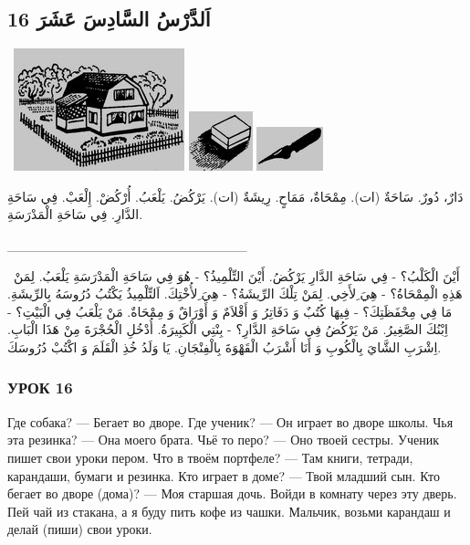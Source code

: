 \documentclass[a5paper]{article}
\begin{document}
\subsection[16 اَلدَّرْسُ السَّادِسَ عَشَرَ]{16 اَلدَّرْسُ السَّادِسَ عَشَرَ}
\  \includegraphics[width=1.948in,height=1.3957in]{images/MuhammadBagauddinprettified-img029.jpg}   \includegraphics[width=0.7291in,height=0.6772in]{images/MuhammadBagauddinprettified-img030.jpg}   \includegraphics[width=0.7602in,height=0.5in]{images/MuhammadBagauddinprettified-img031.jpg} 

دَارٌ، دُورٌ. سَاحَةٌ (ات). مِمْحَاةٌ، مَمَاحٍ. رِيشَةٌ (ات). يَرْكُضُ. يَلْعَبُ. أُرْكُضْ. إِلْعَبْ. فِي سَاحَةِ الدَّارِ. فِي سَاحَةِ الْمَدْرَسَةِ.

\_\_\_\_\_\_\_\_\_\_\_\_\_\_\_\_\_\_\_\_\_\_\_\_\_

\ أَيْنَ الْكَلْبُ؟ - فِي سَاحَةِ الدَّارِ يَرْكُضُ. أَيْنَ التِّلْمِيذُ؟ - هُوَ فِي سَاحَةِ الْمَدْرَسَةِ يَلْعَبُ. لِمَنْ هَذِهِ الْمِمْحَاةُ؟ - هِيَ ِلأَخِي. لِمَنْ تِلْكَ الرِّيشَةُ؟ - هِيَ ِلأُخْتِكَ. اَلتِّلْمِيذُ يَكْتُبُ دُرُوسَهُ بِالرِّيشَةِ. مَا فِي مِحْفَظَتِكَ؟ - فِيهَا كُتُبٌ وَ دَفَاتِرُ وَ أَقْلاَمٌ وَ أَوْرَاقٌ وَ مِمْحَاةٌ. مَنْ يَلْعَبُ فِي الْبَيْتِ؟ - اِبْنُكَ الصَّغِيرُ. مَنْ يَرْكُضُ فِي سَاحَةِ الدَّارِ؟ - بِنْتِي الْكَبِيرَةُ. أُدْخُلِ الْحُجْرَةَ مِنْ هَذَا الْبَابِ. اِشْرَبِ الشَّايَ بِالْكُوبِ وَ أَنَا أَشْرَبُ الْقَهْوَةَ بِالْفِنْجَانِ. يَا وَلَدُ خُذِ الْقَلَمَ وَ اكْتُبْ دُرُوسَكَ.

\subsubsection{УРОК 16}
Где собака? — Бегает во дворе. Где ученик? — Он играет во дворе школы. Чья эта резинка? — Она моего брата. Чьё то перо? — Оно твоей сестры. Ученик пишет свои уроки пером. Что в твоём портфеле? — Там книги, тетради, карандаши, бумаги и резинка. Кто играет в доме? — Твой младший сын. Кто бегает во дворе (дома)? — Моя старшая дочь. Войди в комнату через эту дверь. Пей чай из стакана, а я буду пить кофе из чашки. Мальчик, возьми карандаш и делай (пиши) свои уроки.
\end{document}
